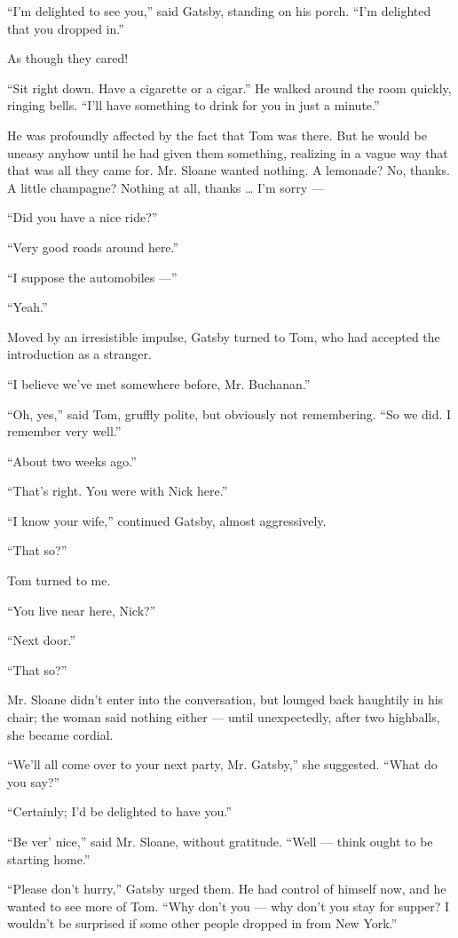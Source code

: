 \documentclass{znotebook}
\begin{document}
``I'm delighted to see you,'' said Gatsby, standing on his porch. ``I'm delighted that you dropped in.''

As though they cared!

``Sit right down. Have a cigarette or a cigar.'' He walked around the room quickly, ringing bells. ``I'll have something to drink for you in just a minute.''

He was profoundly affected by the fact that Tom was there. But he would be uneasy anyhow until he had given them something, realizing in a vague way that that was all they came for. Mr. Sloane wanted nothing. A lemonade? No, thanks. A little champagne? Nothing at all, thanks \dots{} I'm sorry ---

``Did you have a nice ride?''

``Very good roads around here.''

``I suppose the automobiles ---''

``Yeah.''

Moved by an irresistible impulse, Gatsby turned to Tom, who had accepted the introduction as a stranger.

``I believe we've met somewhere before, Mr. Buchanan.''

``Oh, yes,'' said Tom, gruffly polite, but obviously not remembering. ``So we did. I remember very well.''

``About two weeks ago.''

``That's right. You were with Nick here.''

``I know your wife,'' continued Gatsby, almost aggressively.

``That so?''

Tom turned to me.

``You live near here, Nick?''

``Next door.''

``That so?''

Mr. Sloane didn't enter into the conversation, but lounged back haughtily in his chair; the woman said nothing either ---{} until unexpectedly, after two highballs, she became cordial.

``We'll all come over to your next party, Mr. Gatsby,'' she suggested. ``What do you say?''

``Certainly; I'd be delighted to have you.''

``Be ver' nice,'' said Mr. Sloane, without gratitude. ``Well ---{} think ought to be starting home.''

``Please don't hurry,'' Gatsby urged them. He had control of himself now, and he wanted to see more of Tom. ``Why don't you ---{} why don't you stay for supper? I wouldn't be surprised if some other people dropped in from New York.''
\end{document}

